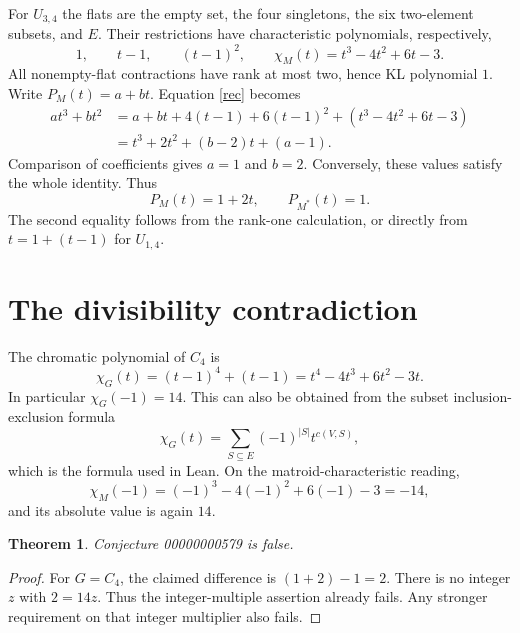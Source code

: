 \documentclass[11pt]{article}
\newtheorem{theorem}{Theorem}
\begin{document}
For $U_{3,4}$ the flats are the empty set, the four singletons, the six two-element subsets, and $E$. Their restrictions have characteristic polynomials, respectively,
\[
 1,\qquad t-1,\qquad (t-1)^2,\qquad
 \chi_M(t)=t^3-4t^2+6t-3.
\]
All nonempty-flat contractions have rank at most two, hence KL polynomial $1$. Write $P_M(t)=a+bt$. Equation \eqref{rec} becomes
\begin{align*}
 at^3+bt^2
  &=a+bt+4(t-1)+6(t-1)^2+(t^3-4t^2+6t-3)\\
  &=t^3+2t^2+(b-2)t+(a-1).
\end{align*}
Comparison of coefficients gives $a=1$ and $b=2$. Conversely, these values satisfy the whole identity. Thus
\[
 P_M(t)=1+2t,\qquad P_{M^*}(t)=1.
\]
The second equality follows from the rank-one calculation, or directly from $t=1+(t-1)$ for $U_{1,4}$.

\section{The divisibility contradiction}
The chromatic polynomial of $C_4$ is
\[
 \chi_G(t)=(t-1)^4+(t-1)=t^4-4t^3+6t^2-3t.
\]
In particular $\chi_G(-1)=14$. This can also be obtained from the subset inclusion-exclusion formula
\[
 \chi_G(t)=\sum_{S\subseteq E}(-1)^{|S|}t^{c(V,S)},
\]
which is the formula used in Lean. On the matroid-characteristic reading,
\[
 \chi_M(-1)=(-1)^3-4(-1)^2+6(-1)-3=-14,
\]
and its absolute value is again $14$.
\begin{theorem}
Conjecture 00000000579 is false.
\end{theorem}
\begin{proof}
For $G=C_4$, the claimed difference is $(1+2)-1=2$. There is no integer $z$ with $2=14z$. Thus the integer-multiple assertion already fails. Any stronger requirement on that integer multiplier also fails.
\end{proof}
\end{document}
